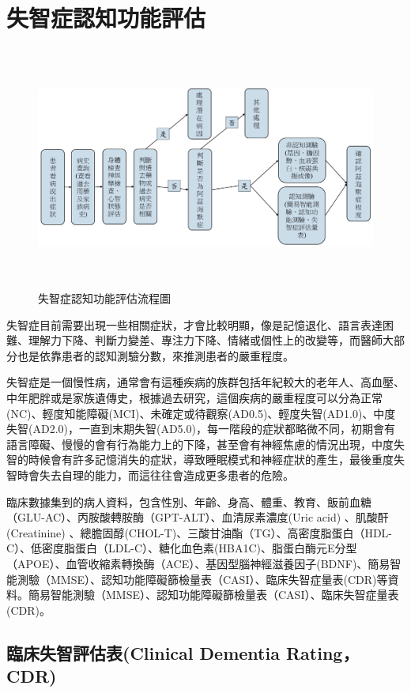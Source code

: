 
\chapter{失智症認知功能評估}
\label{chapter:intro}


\begin{figure}[H]
	\centering
	\centerline{\includegraphics[height=8cm]{pic/ADprocess.PNG}}
	\label{fig:ADProcess}
	\caption{失智症認知功能評估流程圖}
\end{figure}

失智症目前需要出現一些相關症狀，才會比較明顯，像是記憶退化、語言表達困難、理解力下降、判斷力變差、專注力下降、情緒或個性上的改變等，而醫師大部分也是依靠患者的認知測驗分數，來推測患者的嚴重程度。

失智症是一個慢性病，通常會有這種疾病的族群包括年紀較大的老年人、高血壓、中年肥胖或是家族遺傳史，根據過去研究，這個疾病的嚴重程度可以分為正常(NC)、輕度知能障礙(MCI)、未確定或待觀察(AD0.5)、輕度失智(AD1.0)、中度失智(AD2.0)，一直到末期失智(AD5.0)，每一階段的症狀都略微不同，初期會有語言障礙、慢慢的會有行為能力上的下降，甚至會有神經焦慮的情況出現，中度失智的時候會有許多記憶消失的症狀，導致睡眠模式和神經症狀的產生，最後重度失智時會失去自理的能力，而這往往會造成更多患者的危險。

臨床數據集到的病人資料，包含性別、年齡、身高、體重、教育、飯前血糖（GLU-AC）、丙胺酸轉胺酶（GPT-ALT）、血清尿素濃度(Uric acid) 、肌酸酐(Creatinine) 、總膽固醇(CHOL-T)、三酸甘油酯（TG）、高密度脂蛋白（HDL-C）、低密度脂蛋白（LDL-C）、糖化血色素(HBA1C)、脂蛋白酶元E分型（APOE）、血管收縮素轉換酶（ACE）、基因型腦神經滋養因子(BDNF)、簡易智能測驗（MMSE）、認知功能障礙篩檢量表（CASI）、臨床失智症量表(CDR)等資料。簡易智能測驗（MMSE）、認知功能障礙篩檢量表（CASI）、臨床失智症量表(CDR)。

\section{臨床失智評估表(Clinical Dementia Rating，CDR)}

